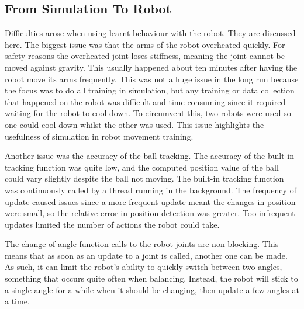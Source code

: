 \documentclass[12pt,a4paper]{article}
\begin{document}
\subsection{From Simulation To Robot}
Difficulties arose when using learnt behaviour with the robot. They are discussed here. The biggest issue was that the arms of the robot overheated quickly. For safety reasons the overheated joint loses stiffness, meaning the joint cannot be moved against gravity. This usually happened about ten minutes after having the robot move its arms frequently. This was not a huge issue in the long run because the focus was to do all training in simulation, but any training or data collection that happened on the robot was difficult and time consuming since it required waiting for the robot to cool down. To circumvent this, two robots were used so one could cool down whilst the other was used. This issue highlights the usefulness of simulation in robot movement training.

Another issue was the accuracy of the ball tracking. The accuracy of the built in tracking function was quite low, and the computed position value of the ball could vary slightly despite the ball not moving. The built-in tracking function was continuously called by a thread running in the background. The frequency of update caused issues since a more frequent update meant the changes in position were small, so the relative error in position detection was greater. Too infrequent updates limited the number of actions the robot could take.

The change of angle function calls to the robot joints are non-blocking. This means that as soon as an update to a joint is called, another one can be made. As such, it can limit the robot's ability to quickly switch between two angles, something that occurs quite often when balancing. Instead, the robot will stick to a single angle for a while when it should be changing, then update a few angles at a time. 

\end{document}
